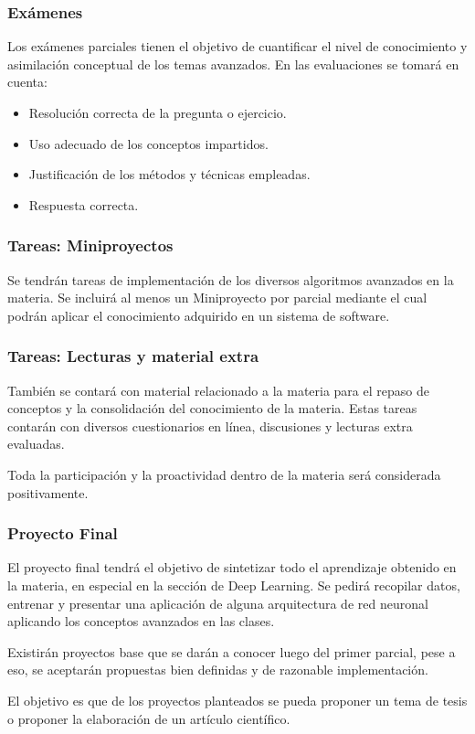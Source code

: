 \documentclass[10pt]{beamer}
\begin{document}
\begin{frame}
    \frametitle{Exámenes}
    Los exámenes parciales tienen el objetivo de cuantificar el nivel de conocimiento 
    y asimilación conceptual de los temas avanzados. En las evaluaciones se tomará en cuenta:
    \begin{itemize}
        \item Resolución correcta de la pregunta o ejercicio.
        \item Uso adecuado de los conceptos impartidos.
        \item Justificación de los métodos y técnicas empleadas.
        \item Respuesta correcta.
    \end{itemize}
\end{frame}

\begin{frame}
    \frametitle{Tareas: Miniproyectos}
    Se tendrán tareas de implementación de los diversos algoritmos avanzados 
    en la materia. Se incluirá al menos un Miniproyecto por parcial mediante el cual podrán 
    aplicar el conocimiento adquirido en un sistema de software.

   
\end{frame}

\begin{frame}
    \frametitle{Tareas: Lecturas y material extra}
    También se contará con material relacionado a la materia para el repaso de 
    conceptos y la consolidación del conocimiento de la materia. Estas tareas 
    contarán con diversos cuestionarios en línea, discusiones y lecturas extra 
    evaluadas. 

    Toda la participación y la proactividad dentro de la materia será considerada 
    positivamente.
   
\end{frame}


\begin{frame}
    \frametitle{Proyecto Final}

    El proyecto final tendrá el objetivo de sintetizar todo el aprendizaje obtenido en la materia, 
    en especial en la sección de Deep Learning. Se pedirá recopilar datos, entrenar y presentar 
    una aplicación de alguna arquitectura de red neuronal aplicando los conceptos avanzados en 
    las clases. 

    Existirán proyectos base que se darán a conocer luego del primer parcial, pese a eso, 
    se aceptarán propuestas bien definidas y de razonable implementación. 

    El objetivo es que de los proyectos planteados se pueda proponer un tema de tesis o proponer
    la elaboración de un artículo científico.

\end{frame}
\end{document}
